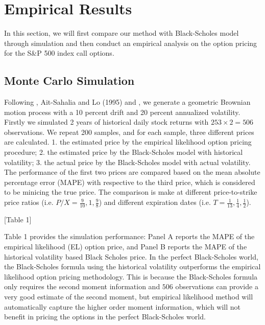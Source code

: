 \section{Empirical Results}
In this section,  we will first compare our method with Black-Scholes model through simulation and then conduct an empirical analysis on the option pricing for the S\&P 500 index call options.  

\subsection{Monte Carlo Simulation}

Following \citet{hutchinson1994nonparametric}, Ait-Sahalia and Lo (1995) and  \citet{stutzer1996simple}, we generate a geometric Brownian motion process with a 10 percent drift and 20 percent annualized volatility. Firstly we simulated 2 years of historical daily stock returns with $253\times 2=506$ observations. We repeat 200 samples, and for each sample, three different prices are calculated. 1. the estimated price by the empirical likelihood option pricing procedure; 2. the estimated price by the Black-Scholes model with historical volatility; 3. the actual price by the Black-Scholes model with actual volatility. The performance of the first two prices are compared based on the mean absolute percentage error (MAPE) with respective to the third price, which is considered to be minicing the true price. The comparison is make at different price-to-strike price ratios (i.e. $P/X=\frac{9}{10}, 1, \frac{9}{8}$) and different expiration dates (i.e. $T=\frac{1}{13}, \frac{1}{4}, \frac{1}{2}$). 


\begin{center}
[Table 1]
\end{center}

Table 1 provides the simulation performance: Panel A reports the MAPE of the empirical likelihood (EL) option price, and Panel B reports the MAPE of the historical volatility based Black Scholes price. In the perfect Black-Scholes world, the Black-Scholes formula using the historical volatility outperforms the empirical likelihood option pricing methodology. This is because the Black-Scholes formula only requires the second moment information and $506$ observations can provide a very good estimate of the second moment, but  empirical likelihood method will automatically capture the higher order moment information, which will not benefit in pricing the options in the perfect Black-Scholes world.  

